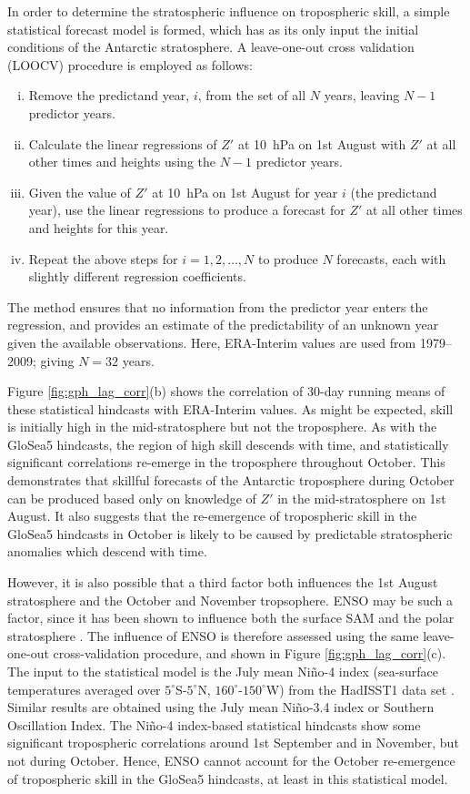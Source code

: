 In order to determine the stratospheric influence on tropospheric skill, a
simple statistical forecast model is formed, which has as its only input the
initial conditions of the Antarctic stratosphere. A leave-one-out cross
validation (LOOCV) \citep{Wilks} procedure is employed as follows:
\begin{enumerate}[i.]
\item Remove the predictand year, $i$, from the set of all $N$ years, leaving
  $N-1$ predictor years. 
\item Calculate the linear regressions of $Z'$ at 10~hPa on 1st August with $Z'$
  at all other times and heights using the $N-1$ predictor years.
\item Given the value of $Z'$ at 10~hPa on 1st August for year $i$ (the
  predictand year), use the linear regressions to produce a forecast for $Z'$ at
  all other times and heights for this year. 
\item Repeat the above steps for $i=1,2,\dots,N$ to produce $N$ forecasts, each
  with slightly different regression coefficients.
\end{enumerate}
The method ensures that no information from the predictor year enters the
regression, and provides an estimate of the predictability of an unknown year
given the available observations. Here, ERA-Interim values are used from
1979--2009; giving $N=32$ years.


Figure \ref{fig:gph_lag_corr}(b) shows the correlation of 30-day running means
of these statistical hindcasts with ERA-Interim values. As might be expected,
skill is initially high in the mid-stratosphere but not the troposphere. As with
the GloSea5 hindcasts, the region of high skill descends with time, and
statistically significant correlations re-emerge in the troposphere throughout
October. This demonstrates that skillful forecasts of the Antarctic troposphere
during October can be produced based only on knowledge of $Z'$ in the
mid-stratosphere on 1st August. It also suggests that the re-emergence of
tropospheric skill in the GloSea5 hindcasts in October is likely to be caused by
predictable stratospheric anomalies which descend with time.

However, it is also possible that a third factor both influences the 1st August
stratosphere and the October and November tropsophere. ENSO may be such a
factor, since it has been shown to influence both the surface SAM
\citep{Lim2013} and the polar stratosphere \citep{Hurwitz2011}. The influence of
ENSO is therefore assessed using the same leave-one-out cross-validation
procedure, and shown in Figure \ref{fig:gph_lag_corr}(c). The input to the
statistical model is the July mean Ni\~no-4 index (sea-surface temperatures
averaged over $5^{\circ}$S-$5^{\circ}$N, $160^{\circ}$-$150^{\circ}$W) from the
HadISST1 data set \citep{Rayner2003}. Similar results are obtained using the
July mean Ni\~no-3.4 index or Southern Oscillation Index. The Ni\~no-4
index-based statistical hindcasts show some significant tropospheric
correlations around 1st September and in November, but not during
October. Hence, ENSO cannot account for the October re-emergence of tropospheric
skill in the GloSea5 hindcasts, at least in this statistical model.

